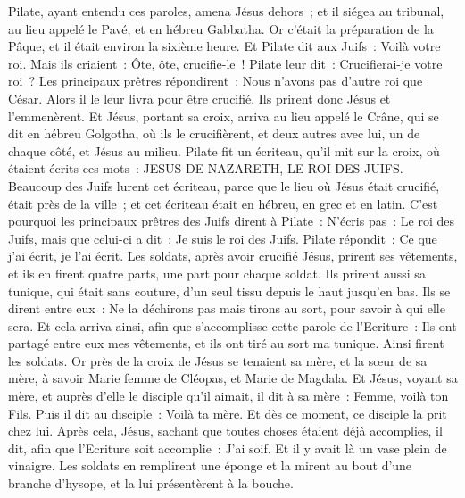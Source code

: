 \begin{multicols}{2}
Pilate, ayant entendu ces paroles, amena Jésus dehors~; et il siégea au tribunal, au lieu appelé le Pavé, et en hébreu Gabbatha.
Or c'était la préparation de la Pâque, et il était environ la sixième heure. Et Pilate dit aux Juifs~: Voilà votre roi.
Mais ils criaient~: Ôte, ôte, crucifie-le~! Pilate leur dit~: Crucifierai-je votre roi~? Les principaux prêtres répondirent~: Nous n'avons pas d'autre roi que César.
Alors il le leur livra pour être crucifié. Ils prirent donc Jésus et l'emmenèrent.
Et Jésus, portant sa croix, arriva au lieu appelé le Crâne, qui se dit en hébreu Golgotha,
où ils le crucifièrent, et deux autres avec lui, un de chaque côté, et Jésus au milieu.
Pilate fit un écriteau, qu'il mit sur la croix, où étaient écrits ces mots~: JESUS DE NAZARETH, LE ROI DES JUIFS.
Beaucoup des Juifs lurent cet écriteau, parce que le lieu où Jésus était crucifié, était près de la ville~; et cet écriteau était en hébreu, en grec et en latin.
C'est pourquoi les principaux prêtres des Juifs dirent à Pilate~: N'écris pas~: Le roi des Juifs, mais que celui-ci a dit~: Je suis le roi des Juifs.
Pilate répondit~: Ce que j'ai écrit, je l'ai écrit.
Les soldats, après avoir crucifié Jésus, prirent ses vêtements, et ils en firent quatre parts, une part pour chaque soldat. Ils prirent aussi sa tunique, qui était sans couture, d'un seul tissu depuis le haut jusqu'en bas.
Ils se dirent entre eux~: Ne la déchirons pas mais tirons au sort, pour savoir à qui elle sera. Et cela arriva ainsi, afin que s'accomplisse cette parole de l'Ecriture~: Ils ont partagé entre eux mes vêtements, et ils ont tiré au sort ma tunique. Ainsi firent les soldats.
Or près de la croix de Jésus se tenaient sa mère, et la sœur de sa mère, à savoir Marie femme de Cléopas, et Marie de Magdala.
Et Jésus, voyant sa mère, et auprès d'elle le disciple qu'il aimait, il dit à sa mère~: Femme, voilà ton Fils.
Puis il dit au disciple~: Voilà ta mère. Et dès ce moment, ce disciple la prit chez lui.
Après cela, Jésus, sachant que toutes choses étaient déjà accomplies, il dit, afin que l'Ecriture soit accomplie~: J'ai soif.
Et il y avait là un vase plein de vinaigre. Les soldats en remplirent une éponge et la mirent au bout d'une branche d'hysope, et la lui présentèrent à la bouche.

\end{multicols}
